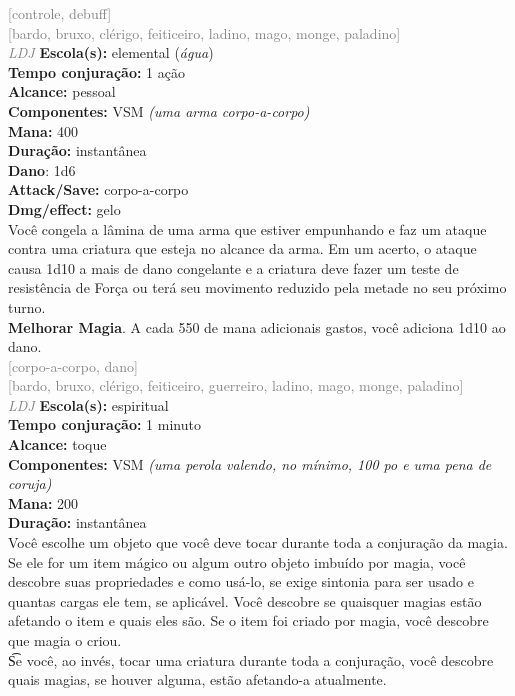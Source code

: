 \documentclass{RPG_Adventure}[2021/10/20]
\begin{document}
{\scriptsize \textcolor{gray}{[controle, debuff]\\}}
{\scriptsize \textcolor{gray}{[bardo, bruxo, clérigo, feiticeiro, ladino, mago, monge, paladino]\\}}
{\tiny \textcolor{gray}{\textit{LDJ}}}
{\small \t \textbf{Escola(s):} elemental (\textit{água})\\\t \textbf{Tempo conjuração:} 1 ação\\\t \textbf{Alcance:} pessoal\\\t \textbf{Componentes:} VSM \textit{(uma arma corpo-a-corpo)}\\\t \textbf{Mana:} 400\\\t \textbf{Duração:} instantânea\\\t \textbf{Dano}: 1d6\\\t \textbf{Attack/Save:} corpo-a-corpo\\\t \textbf{Dmg/effect:} gelo\\}
{\normalsize Você congela a lâmina de uma arma que estiver empunhando e faz um ataque contra uma criatura que esteja no alcance da arma. Em um acerto, o ataque causa 1d10 a mais de dano congelante e a criatura deve fazer um teste de resistência de Força ou terá seu movimento reduzido pela metade no seu próximo turno.\\\t \textbf{Melhorar Magia}. A cada 550 de mana adicionais gastos, você adiciona 1d10 ao dano.\\}
{\scriptsize \textcolor{gray}{[corpo-a-corpo, dano]\\}}
{\scriptsize \textcolor{gray}{[bardo, bruxo, clérigo, feiticeiro, guerreiro, ladino, mago, monge, paladino]\\}}
{\tiny \textcolor{gray}{\textit{LDJ}}}
{\small \t \textbf{Escola(s):} espiritual\\\t \textbf{Tempo conjuração:} 1 minuto\\\t \textbf{Alcance:} toque\\\t \textbf{Componentes:} VSM \textit{(uma perola valendo, no mínimo, 100 po e uma pena de coruja)}\\\t \textbf{Mana:} 200\\\t \textbf{Duração:} instantânea\\}
{\normalsize Você escolhe um objeto que você deve tocar durante toda a conjuração da magia. Se ele for um item mágico ou algum outro objeto imbuído por magia, você descobre suas propriedades e como usá-lo, se exige sintonia para ser usado e quantas cargas ele tem, se aplicável. Você descobre se quaisquer magias estão afetando o item e quais eles são. Se o item foi criado por magia, você descobre que magia o criou.  \\\t Se você, ao invés, tocar uma criatura durante toda a conjuração, você descobre quais magias, se houver alguma, estão afetando-a atualmente.\\}
\end{document}
